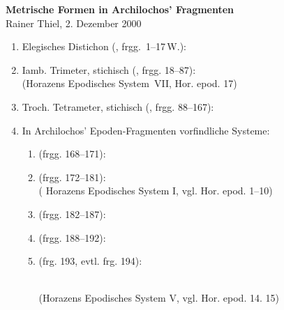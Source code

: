 \documentclass[11pt]{article}
\begin{document}
\begin{center}
{\Large\bf Metrische Formen in Archilochos' Fragmenten}\\
\vspace{2ex}
{\small Rainer Thiel, 2. Dezember  2000}
\end{center}
\begin{enumerate}
\item Elegisches Distichon (,
frgg.~1--17\,W.):\\
  \metra{\m\mbb\m\mbb\m\c\m\bb\m\bb\m}
\item Iamb. Trimeter, stichisch (, frgg. 18--87):
  \\ (Horazens Epodisches \glq
  System\grq\ VII, Hor. epod. 17)
\item Troch. Tetrameter, stichisch (, frgg. 88--167):\par%
\metra{\m\b\m\a\s\m\b\m\a\c\m\b\m\a\s\m\b\m}

\item In Archilochos' Epoden-Fragmenten vorfindliche Systeme:

\begin{enumerate}
\item {} (frgg. 168--171):
  \metra{\bbmb\m\bbmb\m\bbmb\m\bm\c\m\b\m\b\m\bm}

\item {} (frgg. 172--181):
  \metra{\a\m\b\m\s\a\m\b\m\s\a\m\b\m\cc\a\m\b\m\s\a\m\b\m}\\(
  Horazens Epodisches System I, vgl. Hor. epod. 1--10)

\item {} (frgg. 182--187): %
  \metra{\a\m\b\m\s\a\m\b\m\s\a\m\b\m\cc\m\bb\m\bb\m}

\item {} (frgg. 188--192):\par%
\metra{\m\mbb\m\mbb\m\mbb\m\mbb\c\m\b\m\b\m\bm\cc\a\m\b\m\s\a\m\b\m\s\b\m\m}

\item {} (frg. 193, evtl. frg. 194):\par%
\metra{\m\mbb\m\mbb\m\mbb\m\mbb\m\mbb\m\a\cc\a\m\b\m\s\a\m\b\m}\\
(Horazens Epodisches System V, vgl. Hor. epod. 14. 15)


\end{enumerate}
\end{enumerate}
\end{document}
